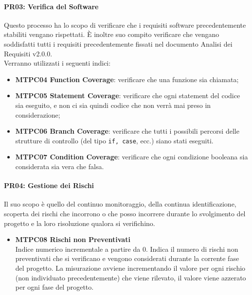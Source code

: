 \paragraph{PR03: Verifica del Software}
Questo processo ha lo scopo di verificare che i requisiti software precedentemente stabiliti vengano rispettati. È inoltre suo compito verificare che vengano soddisfatti
tutti i requisiti precedentemente fissati nel documento Analisi dei Requisiti v2.0.0. \-\\ Verranno utilizzati i seguenti indici:

\begin{itemize}
	\item \textbf{MTPC04 Function Coverage}: verificare che una funzione sia chiamata;
	\item \textbf{MTPC05 Statement Coverage}: verificare che ogni statement del codice sia eseguito, e non ci sia quindi codice che non verrà mai preso in considerazione;
	\item \textbf{MTPC06 Branch Coverage}: verificare che tutti i possibili percorsi delle strutture di controllo (del tipo \texttt{if, case}, ecc.) siano stati eseguiti.
	\item \textbf{MTPC07 Condition Coverage}: verificare che ogni condizione booleana sia considerata sia vera che falsa.
\end{itemize}

\paragraph{PR04: Gestione dei Rischi}
Il suo scopo è quello del continuo monitoraggio, della continua identificazione, scoperta dei rischi che incorrono o che posso incorrere durante lo svolgimento del progetto e la loro risoluzione qualora si verifichino.
\begin{itemize}

\item \textbf{MTPC08 Rischi non Preventivati}\-\\
Indice numerico incrementale a partire da 0. Indica il numero di rischi non preventivati che si verificano e vengono considerati durante la corrente fase del progetto. La misurazione avviene incrementando il valore per ogni rischio (non individuato precedentemente) che viene rilevato, il valore viene azzerato per ogni fase del progetto.

\end{itemize}

